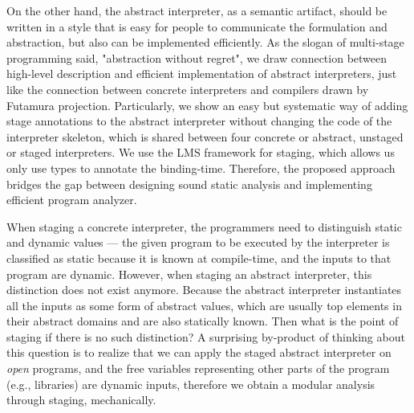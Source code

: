 On the other hand, the abstract interpreter, as a semantic artifact, should be
written in a style that is easy for people to communicate the formulation and
abstraction, but also can be implemented efficiently. As the slogan of
multi-stage programming said, "abstraction without regret", we draw connection
between high-level description and efficient implementation of abstract
interpreters, just like the connection between concrete interpreters and
compilers drawn by Futamura projection. Particularly, we show an easy but
systematic way of adding stage annotations to the abstract interpreter without
changing the code of the interpreter skeleton, which is shared between four concrete
or abstract, unstaged or staged interpreters. We use the LMS framework for staging,
which allows us only use types to annotate the binding-time. Therefore, the
proposed approach bridges the gap between designing sound static analysis and
implementing efficient program analyzer.


When staging a concrete interpreter, the programmers need to distinguish static
and dynamic values --- the given program to be executed by the interpreter is
classified as static because it is known at compile-time, and the inputs to that
program are dynamic. However, when staging an abstract interpreter, this
distinction does not exist anymore. Because the abstract interpreter
instantiates all the inputs as some form of abstract values, which are usually
top elements in their abstract domains and are also statically known. Then what
is the point of staging if there is no such distinction? A surprising by-product
of thinking about this question is to realize that we can apply the staged
abstract interpreter on \textit{open} programs, and the free variables
representing other parts of the program (e.g., libraries) are dynamic inputs,
therefore we obtain a modular analysis through staging, mechanically.
\fi

